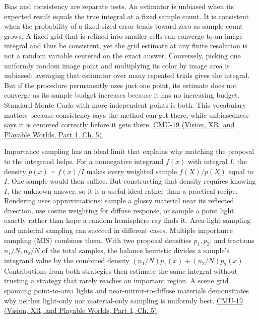 Bias and consistency are separate tests. An estimator is unbiased when its expected result equals the true integral at a fixed sample count. It is consistent when the probability of a fixed-sized error tends toward zero as sample count grows. A fixed grid that is refined into smaller cells can converge to an image integral and thus be consistent, yet the grid estimate at any finite resolution is not a random variable centered on the exact answer. Conversely, picking one uniformly random image point and multiplying its color by image area is unbiased: averaging that estimator over many repeated trials gives the integral. But if the procedure permanently uses just one point, its estimate does not converge as its sample budget increases because it has no increasing budget. Standard Monte Carlo with more independent points is both. This vocabulary matters because consistency says the method can get there, while unbiasedness says it is centered correctly before it gets there. \href{../07-Vision-XR-and-Playable-Worlds-P01/main.pdf\#04-visual-computing-ii-ch036-cmu-19---variance-reduction}{CMU-19 (Vision, XR, and Playable Worlds, Part 1, Ch. 5)}

Importance sampling has an ideal limit that explains why matching the proposal to the integrand helps. For a nonnegative integrand \(f(x)\) with integral \(I\), the density \(p(x)=f(x)/I\) makes every weighted sample \(f(X)/p(X)\) equal to \(I\). One sample would then suffice. But constructing that density requires knowing \(I\), the unknown answer, so it is a useful ideal rather than a practical recipe. Rendering uses approximations: sample a glossy material near its reflected direction, use cosine weighting for diffuse response, or sample a point light exactly rather than hope a random hemisphere ray finds it. Area-light sampling and material sampling can succeed in different cases. Multiple importance sampling (MIS) combines them. With two proposal densities \(p_1,p_2\), and fractions \(n_1/N,n_2/N\) of the total samples, the balance heuristic divides a sample's integrand value by the combined density \((n_1/N)p_1(x)+(n_2/N)p_2(x)\). Contributions from both strategies then estimate the same integral without trusting a strategy that rarely reaches an important region. A scene grid spanning point-to-area lights and near-mirror-to-diffuse materials demonstrates why neither light-only nor material-only sampling is uniformly best. \href{../07-Vision-XR-and-Playable-Worlds-P01/main.pdf\#04-visual-computing-ii-ch036-cmu-19---variance-reduction}{CMU-19 (Vision, XR, and Playable Worlds, Part 1, Ch. 5)}

